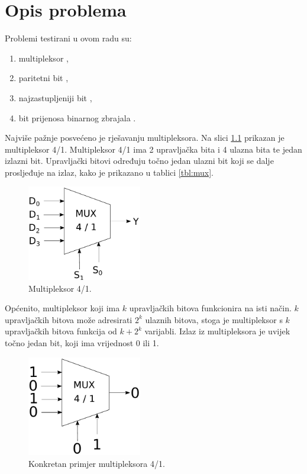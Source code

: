 \documentclass[times, utf8, zavrsni]{fer}
\begin{document}
\chapter{Opis problema} \label{ch:prob}
Problemi testirani u ovom radu su:
\begin{enumerate}
    \item multipleksor ,
    \item paritetni bit ,
    \item najzastupljeniji bit ,
    \item bit prijenosa binarnog zbrajala .
\end{enumerate}

Najviše pažnje posvećeno je rješavanju multipleksora.
Na slici \ref{img:mux} prikazan je multipleksor 4/1.
Multipleksor 4/1 ima 2 upravljačka bita i 4 ulazna bita te jedan izlazni bit.
Upravljački bitovi određuju točno jedan ulazni bit koji se dalje prosljeđuje na izlaz, kako je prikazano u tablici \ref{tbl:mux}.
\begin{figure}[h]
    \centering
    \includegraphics[width=5cm]{img/mux.pdf}
    \caption{Multipleksor 4/1.}
    \label{img:mux}
\end{figure}
Općenito, multipleksor koji ima $k$ upravljačkih bitova funkcionira na isti način.
$k$ upravljačkih bitova može adresirati $2^{k}$ ulaznih bitova, stoga je multipleksor s $k$ upravljačkih bitova funkcija od $k + 2^{k}$ varijabli.
Izlaz iz multipleksora je uvijek točno jedan bit, koji ima vrijednost 0 ili 1.
\begin{figure}[h]
    \centering
    \includegraphics[width=5cm]{img/muxex.pdf}
    \caption{Konkretan primjer multipleksora 4/1.}
    \label{img:muxex}
\end{figure}
\end{document}
